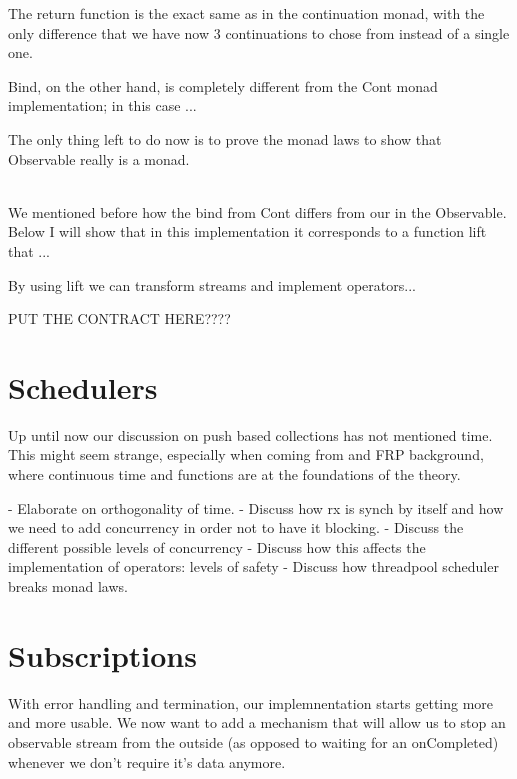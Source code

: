 The return function is the exact same as in the continuation monad, with the only difference that we have now 3 continuations to chose from instead of a single one. 

Bind, on the other hand, is completely different from the Cont monad implementation; in this case ... 

The only thing left to do now is to prove the monad laws to show that Observable really is a monad.

\\

We mentioned before how the bind from Cont differs from our in the Observable. Below I will show that in this implementation it corresponds to a function lift that ... 

By using lift we can transform streams and implement operators...


PUT THE CONTRACT HERE????

\section{Schedulers}

Up until now our discussion on push based collections has not mentioned time. This might seem strange, especially when coming from and FRP background, where continuous time and functions are at the foundations of the theory. 

- Elaborate on orthogonality of time.
- Discuss how rx is synch by itself and how we need to add concurrency in order not to have it blocking. 
- Discuss the different possible levels of concurrency
- Discuss how this affects the implementation of operators: levels of safety
- Discuss how threadpool scheduler breaks monad laws. 

\section{Subscriptions}

With error handling and termination, our implemnentation starts getting more and more usable. We now want to add a mechanism that will allow us to stop an observable stream from the outside (as opposed to waiting for an onCompleted) whenever we don't require it's data anymore. 

